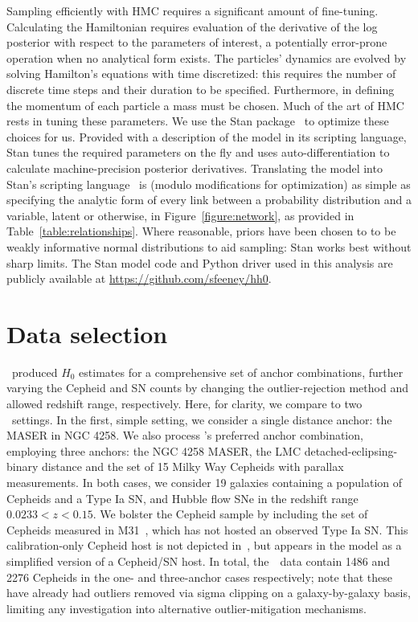 \documentclass[a4paper,fleqn,usenatbib]{mnras}
\newcommand{\riess}{\citetalias{Riess_etal:2016}}
\begin{document}
{Sampling efficiently with HMC requires a significant amount of fine-tuning. Calculating the Hamiltonian requires evaluation of the derivative of the log posterior with respect to the parameters of interest, a potentially error-prone operation when no analytical form exists. The particles' dynamics are evolved by solving Hamilton's equations with time discretized: this requires the number of discrete time steps and their duration to be specified. Furthermore, in defining the momentum of each particle a mass must be chosen. Much of the art of HMC rests in tuning these parameters. We use the Stan package~\citep{pystan} to optimize these choices for us. Provided with a description of the model in its scripting language, Stan tunes the required parameters on the fly and uses auto-differentiation to calculate machine-precision posterior derivatives. Translating the model into Stan's scripting language~\citep{stan_manual} is (modulo modifications for optimization) as simple as specifying the analytic form of every link between a probability distribution and a variable, latent or otherwise, in Figure~\ref{figure:network}, as provided in Table~\ref{table:relationships}. Where reasonable, priors have been chosen to to be weakly informative normal distributions to aid sampling: Stan works best without sharp limits. The Stan model code and Python driver used in this analysis are publicly available at \url{https://github.com/sfeeney/hh0}.


\section{Data selection}
\label{section:data}

\riess\ produced $H_0$ estimates for a comprehensive set of anchor combinations, further varying the Cepheid and SN counts by changing the outlier-rejection method and allowed redshift range, respectively. Here, for clarity, we compare to two \riess\ settings. In the first, simple setting, we consider a single distance anchor: the MASER in NGC 4258. We also process \riess's preferred anchor combination, employing three anchors: the NGC 4258 MASER, the LMC detached-eclipsing-binary distance and the set of 15 Milky Way Cepheids with parallax measurements. In both cases, we consider 19 galaxies containing a population of Cepheids and a Type Ia SN, and Hubble flow SNe in the redshift range $0.0233 < z < 0.15$. We bolster the Cepheid sample by including the set of Cepheids measured in M31~\citep{Riess_etal:2012,Kodric_etal:2015,Wagner-Kaiser_etal:2015}, which has not hosted an observed Type Ia SN. This calibration-only Cepheid host is not depicted in~, but appears in the model as a simplified version of a Cepheid/SN host. In total, the~\riess\ data contain 1486 and 2276 Cepheids in the one- and three-anchor cases respectively; note that these have already had outliers removed via sigma clipping on a galaxy-by-galaxy basis, limiting any investigation into alternative outlier-mitigation mechanisms.

}
\end{document}
